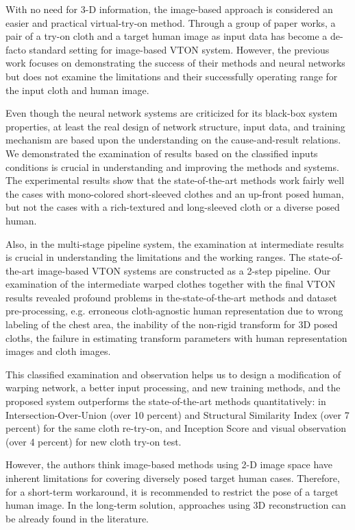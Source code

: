 \documentclass[runningheads]{llncs}
\begin{document}
With no need for 3-D information, the image-based approach is considered an easier and practical virtual-try-on method. Through a group of paper works, a pair of a try-on cloth and a target human image as input data has become a de-facto standard setting for image-based VTON system.   
However, the previous work focuses on demonstrating the success of their methods and neural networks but does not examine the limitations and their successfully operating range for the input cloth and human image.  

Even though the neural network systems are criticized for its black-box system properties, at least the real design of network structure, input data, and training mechanism are based upon the understanding on the cause-and-result relations. We demonstrated the examination of results based on the classified inputs conditions is crucial in understanding and improving the methods and systems. The experimental results show that the state-of-the-art methods work fairly well the cases with mono-colored short-sleeved clothes and an up-front posed human, but not the cases with a rich-textured and long-sleeved cloth or a diverse posed human.    

Also, in the multi-stage pipeline system, the examination at intermediate results is crucial in understanding the limitations and the working ranges. The state-of-the-art image-based VTON systems are constructed as a 2-step pipeline. Our examination of the intermediate warped clothes together with the final VTON results revealed profound problems in the-state-of-the-art methods and dataset pre-processing, e.g. erroneous cloth-agnostic human representation due to wrong labeling of the chest area, the inability of the non-rigid transform for 3D posed cloths, the failure in estimating transform parameters with human representation images and cloth images.    

This classified examination and observation helps us to design a modification of warping network, a better input processing, and new training methods, and the proposed system outperforms the state-of-the-art methods quantitatively: in Intersection-Over-Union (over 10 percent) and Structural Similarity Index (over 7 percent) for the same cloth re-try-on, and Inception Score and visual observation (over 4 percent) for new cloth try-on test.     

However, the authors think image-based methods using 2-D image space have inherent limitations for covering diversely posed target human cases. Therefore, for a short-term workaround, it is recommended to restrict the pose of a target human image. In the long-term solution, approaches using 3D reconstruction \cite{natsume2019siclope,zanfir2018human} can be already found in the literature. 

     
\clearpage
%
%


\end{document}
